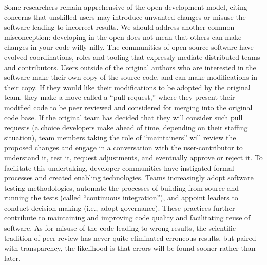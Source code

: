 \documentclass{statement}
\begin{document}
Some researchers remain apprehensive of the open development model, citing concerns that unskilled users may introduce unwanted changes or misuse the software leading to incorrect results. 
We should address another common misconception: developing in the open does not mean that others can make changes in your code willy-nilly. 
The communities of open source software have evolved coordinations, roles and tooling that expressly mediate distributed teams and contributors. 
Users outside of the original authors who are interested in the software make their own copy of the source code, and can make modifications in their copy. 
If they would like their modifications to be adopted by the original team, they make a move called a ``pull request,'' where they present their modified code to be peer reviewed and considered for merging into the original code base. 
If the original team has decided that they will consider such pull requests (a choice developers make ahead of time, depending on their staffing situation), team members taking the role of ``maintainers'' will review the proposed changes and engage in a conversation with the user-contributor to understand it, test it, request adjustments, and eventually approve or reject it. 
To facilitate this undertaking, developer communities have instigated formal processes and created enabling technologies. 
Teams increasingly adopt software testing methodologies, automate the processes of building from source and running the tests (called ``continuous integration''), and appoint leaders to conduct decision-making (i.e., adopt governance). 
These practices further contribute to maintaining and improving code quality and facilitating reuse of software. 
As for misuse of the code leading to wrong results, the scientific tradition of peer review has never quite eliminated erroneous results, but paired with transparency, the likelihood is that errors will be found sooner rather than later.
\end{document}
